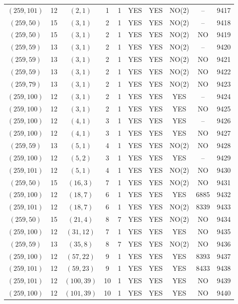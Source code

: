 \begin{longtable}{|c|c|c|c|c|c|c|c|c|c|}
$(259, 101)$ & 12 & $(2, 1)$ & 1 & 1 & YES & YES & NO(2) & -- & 9417\\
$(259, 50)$ & 15 & $(3, 1)$ & 2 & 1 & YES & YES & NO(2) & -- & 9418\\
$(259, 50)$ & 15 & $(3, 1)$ & 2 & 1 & YES & YES & NO(2) & NO & 9419\\
$(259, 59)$ & 13 & $(3, 1)$ & 2 & 1 & YES & YES & NO(2) & -- & 9420\\
$(259, 59)$ & 13 & $(3, 1)$ & 2 & 1 & YES & YES & NO(2) & NO & 9421\\
$(259, 59)$ & 13 & $(3, 1)$ & 2 & 1 & YES & YES & NO(2) & NO & 9422\\
$(259, 79)$ & 13 & $(3, 1)$ & 2 & 1 & YES & YES & NO(2) & NO & 9423\\
$(259, 100)$ & 12 & $(3, 1)$ & 2 & 1 & YES & YES & YES & -- & 9424\\
$(259, 100)$ & 12 & $(3, 1)$ & 2 & 1 & YES & YES & YES & NO & 9425\\
$(259, 100)$ & 12 & $(4, 1)$ & 3 & 1 & YES & YES & YES & -- & 9426\\
$(259, 100)$ & 12 & $(4, 1)$ & 3 & 1 & YES & YES & YES & NO & 9427\\
$(259, 59)$ & 13 & $(5, 1)$ & 4 & 1 & YES & YES & NO(2) & NO & 9428\\
$(259, 100)$ & 12 & $(5, 2)$ & 3 & 1 & YES & YES & YES & -- & 9429\\
$(259, 101)$ & 12 & $(5, 1)$ & 4 & 1 & YES & YES & NO(2) & NO & 9430\\
$(259, 50)$ & 15 & $(16, 3)$ & 7 & 1 & YES & YES & NO(2) & NO & 9431\\
$(259, 100)$ & 12 & $(18, 7)$ & 6 & 1 & YES & YES & YES & 6885 & 9432\\
$(259, 101)$ & 12 & $(18, 7)$ & 6 & 1 & YES & YES & NO(2) & 8339 & 9433\\
$(259, 50)$ & 15 & $(21, 4)$ & 8 & 7 & YES & YES & NO(2) & NO & 9434\\
$(259, 100)$ & 12 & $(31, 12)$ & 7 & 1 & YES & YES & YES & NO & 9435\\
$(259, 59)$ & 13 & $(35, 8)$ & 8 & 7 & YES & YES & NO(2) & NO & 9436\\
$(259, 100)$ & 12 & $(57, 22)$ & 9 & 1 & YES & YES & YES & 8393 & 9437\\
$(259, 101)$ & 12 & $(59, 23)$ & 9 & 1 & YES & YES & YES & 8433 & 9438\\
$(259, 101)$ & 12 & $(100, 39)$ & 10 & 1 & YES & YES & YES & NO & 9439\\
$(259, 100)$ & 12 & $(101, 39)$ & 10 & 1 & YES & YES & YES & NO & 9440\\

\end{longtable}
